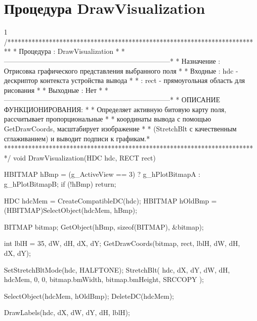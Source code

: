 \section{Процедура DrawVisualization}\footnotesize
\begin{listing}{1}
/*************************************************************************
* Процедура      : DrawVisualization                                     *
*------------------------------------------------------------------------*
* Назначение     : Отрисовка графического представления выбранного поля   *
* Входные        : hdc  - дескриптор контекста устройства вывода         *
*                : rect - прямоугольная область для рисования            *
* Выходные       : Нет                                                   *
*------------------------------------------------------------------------*
* ОПИСАНИЕ ФУНКЦИОНИРОВАНИЯ:                                             *
* Определяет активную битовую карту поля, рассчитывает пропорциональные *
* координаты вывода с помощью GetDrawCoords, масштабирует изображение   *
* (StretchBlt с качественным сглаживанием) и выводит подписи к графикам.*
*************************************************************************/
void DrawVisualization(HDC hdc, RECT rect) {
    HBITMAP hBmp = (g_ActiveView == 3) ? g_hPlotBitmapA : g_hPlotBitmapB;
    if (!hBmp) return;
    
    HDC hdcMem = CreateCompatibleDC(hdc);
    HBITMAP hOldBmp = (HBITMAP)SelectObject(hdcMem, hBmp);
    
    BITMAP bitmap;
    GetObject(hBmp, sizeof(BITMAP), &bitmap);
    
    int lblH = 35, dW, dH, dX, dY;
    GetDrawCoords(bitmap, rect, lblH, dW, dH, dX, dY);
    
    SetStretchBltMode(hdc, HALFTONE);
    StretchBlt(
        hdc, dX, dY, dW, dH, hdcMem, 0, 0,
        bitmap.bmWidth, bitmap.bmHeight, SRCCOPY
    );
    
    SelectObject(hdcMem, hOldBmp);
    DeleteDC(hdcMem);
    
    DrawLabels(hdc, dX, dW, dY, dH, lblH);
}
\end{listing}
\normalsize

\pagebreak

